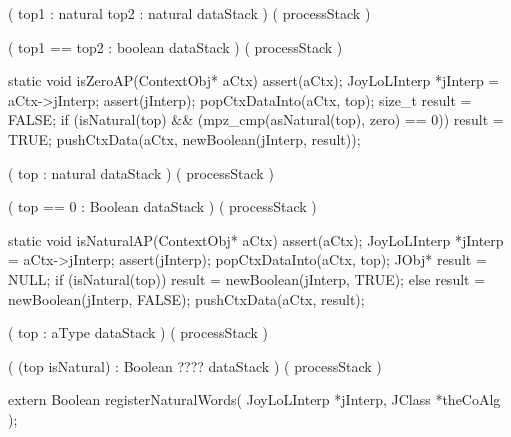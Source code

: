 \starttyping

\startWord[equal]

\preDataStack
  (
    top1 : natural
    top2 : natural
    dataStack
  )
\preProcessStack
  ( processStack )
\preConditions
\stopPreConditions

\postDataStack
  (
    top1 == top2 : boolean
    dataStack
  )
\postProcessStack
  ( processStack )
\postConditions
\stopPostConditions

\stopWord

\stoptyping

\startCCode
static void isZeroAP(ContextObj* aCtx) {
  assert(aCtx);
  JoyLoLInterp *jInterp = aCtx->jInterp;
  assert(jInterp);
  popCtxDataInto(aCtx, top);
  size_t result = FALSE;
  if (isNatural(top) &&
      (mpz_cmp(asNatural(top), zero) == 0)) result = TRUE;
  pushCtxData(aCtx, newBoolean(jInterp, result));
}
\stopCCode

\starttyping

\startWord[isZero]

\preDataStack
  (
    top : natural
    dataStack
  )
\preProcessStack
  ( processStack )
\preConditions
\stopPreConditions

\postDataStack
  (
    top == 0 : Boolean
    dataStack
  )
\postProcessStack
  ( processStack )
\postConditions
\stopPostConditions

\stopWord

\stoptyping

\startCCode
static void isNaturalAP(ContextObj* aCtx) {
  assert(aCtx);
  JoyLoLInterp *jInterp = aCtx->jInterp;
  assert(jInterp);
  popCtxDataInto(aCtx, top);
  JObj* result = NULL;
  if (isNatural(top))
    result = newBoolean(jInterp, TRUE);
  else
    result = newBoolean(jInterp, FALSE);
  pushCtxData(aCtx, result);
}
\stopCCode

\starttyping

\startWord[isNatural]

\preDataStack
  (
    top : aType
    dataStack
  )
\preProcessStack
  ( processStack )
\preConditions
\stopPreConditions

\postDataStack
  ( 
    (top isNatural) : Boolean ????
    dataStack
  )
\postProcessStack
  ( processStack )
\postConditions
\stopPostConditions

\stopWord

\stoptyping

\startCHeader
extern Boolean registerNaturalWords(
  JoyLoLInterp *jInterp,
  JClass       *theCoAlg
);
\stopCHeader
{}

